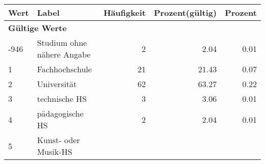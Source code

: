      \begin{longtable}{lXrrr}
     \toprule
     \textbf{Wert} & \textbf{Label} & \textbf{Häufigkeit} & \textbf{Prozent(gültig)} & \textbf{Prozent} \\
     \endhead
     \midrule
     \multicolumn{5}{l}{\textbf{Gültige Werte}}\\

     -946 &
     \multicolumn{1}{X}{ Studium ohne nähere Angabe   } &


       \num{2} &
       \num[round-mode=places,round-precision=2]{2,04} &
         \num[round-mode=places,round-precision=2]{0,01} \\

     1 &
     \multicolumn{1}{X}{ Fachhochschule   } &


       \num{21} &
       \num[round-mode=places,round-precision=2]{21,43} &
         \num[round-mode=places,round-precision=2]{0,07} \\

     2 &
     \multicolumn{1}{X}{ Universität   } &


       \num{62} &
       \num[round-mode=places,round-precision=2]{63,27} &
         \num[round-mode=places,round-precision=2]{0,22} \\

     3 &
     \multicolumn{1}{X}{ technische HS   } &


       \num{3} &
       \num[round-mode=places,round-precision=2]{3,06} &
         \num[round-mode=places,round-precision=2]{0,01} \\

     4 &
     \multicolumn{1}{X}{ pädagogische HS   } &


       \num{2} &
       \num[round-mode=places,round-precision=2]{2,04} &
         \num[round-mode=places,round-precision=2]{0,01} \\

     5 &
     \multicolumn{1}{X}{ Kunst- oder Musik-HS   } &



\end{longtable}
